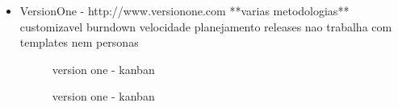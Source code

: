 \begin{itemize}
\item VersionOne - http://www.versionone.com
**varias metodologias**
customizavel
burndown
velocidade
planejamento releases
nao trabalha com templates nem personas

\begin{figure}[H]
  \centering
  \caption{version one - kanban}
\end{figure}

\begin{figure}[H]
  \centering
  \caption{version one - kanban}
\end{figure}


\end{itemize}
